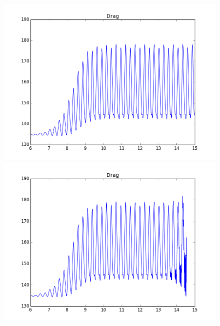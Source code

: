 \begin{figure}[H] 
  \begin{minipage}[t][7cm][t]{0.5\linewidth}
    \centering
    \includegraphics[scale=0.36]{./Temporal_stability/FSI2_001_051_big.png} 
    \vspace{4ex}
  \end{minipage}%
  \begin{minipage}[t][7cm][t]{0.5\linewidth}
    \centering
    \includegraphics[scale=0.36]{./Temporal_stability/FSI2_001_050_big.png} 
    \vspace{4ex}
  \end{minipage} 
  \begin{minipage}[t][7cm][t]{0.49\linewidth}
    \centering

\end{minipage}
\end{figure}
